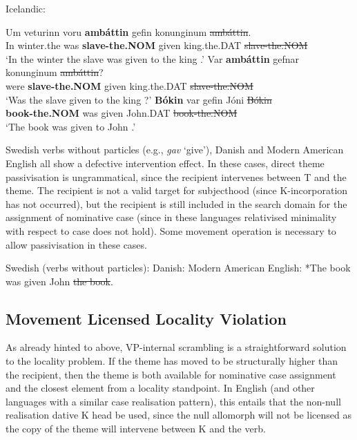{\begin{exe}
\ex Icelandic:
\begin{xlist}
	\ex \gll Um veturinn voru \textbf{amb\'{a}ttin} gefin konunginum \sout{amb\'{a}ttin}.\\
	In winter.the was \textbf{slave-the.NOM} given king.the.DAT \sout{slave-the.NOM}\\
\trans `In the winter the slave was given to the king \citep[ex. 47b]{Zaenen.1985}.'
\ex \gll Var \textbf{amb\'{a}ttin} gefnar konunginum \sout{amb\'{a}ttin}?\\
were \textbf{slave-the.NOM} given king.the.DAT \sout{slave-the.NOM}\\
\trans `Was the slave given to the king \citep[ex. 48b]{Zaenen.1985}?'
\ex \gll \textbf{B\'{o}kin} var gefin J\'{o}ni \sout{B\'{o}kin}\\
\textbf{book-the.NOM} was given John.DAT \sout{book-the.NOM}\\
\trans `The book was given to John \citep{Holmberg.1995,Bardal.2001}.'
\end{xlist}
\end{exe}

Swedish verbs without particles (e.g., \textit{gav} `give'), Danish and Modern American English all show a defective intervention effect. In these cases, direct theme passivisation is ungrammatical, since the recipient intervenes between T and the theme. The recipient is not a valid target for subjecthood (since K-incorporation has not occurred), but the recipient is still included in the search domain for the assignment of nominative case (since in these languages relativised minimality with respect to case does not hold). Some movement operation is necessary to allow passivisation in these cases.

\begin{exe}
	\ex Swedish (verbs without particles):
	 \ex Danish:
	\ex Modern American English: *The book was given John \sout{the book}.
\end{exe}

\subsection{Movement Licensed Locality Violation}
As already hinted to above, VP-internal scrambling is a straightforward solution to the locality problem. If the theme has moved to be structurally higher than the recipient, then the theme is both available for nominative case assignment and the closest element from a locality standpoint. In English (and other languages with a similar case realisation pattern), this entails that the non-null realisation dative K head be used, since the null allomorph will not be licensed as the copy of the theme will intervene between K and the verb.

}

